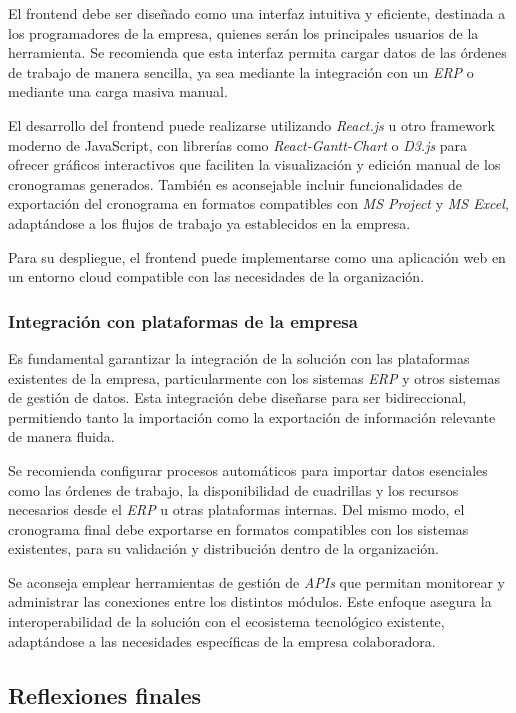 \documentclass{article}
\begin{document}
El frontend debe ser diseñado como una interfaz intuitiva y eficiente, destinada a los programadores de la empresa, quienes serán los principales usuarios de la herramienta. Se recomienda que esta interfaz permita cargar datos de las órdenes de trabajo de manera sencilla, ya sea mediante la integración con un \textit{ERP} o mediante una carga masiva manual.

El desarrollo del frontend puede realizarse utilizando \textit{React.js} u otro framework moderno de JavaScript, con librerías como \textit{React-Gantt-Chart} o \textit{D3.js} para ofrecer gráficos interactivos que faciliten la visualización y edición manual de los cronogramas generados. También es aconsejable incluir funcionalidades de exportación del cronograma en formatos compatibles con \textit{MS Project} y \textit{MS Excel}, adaptándose a los flujos de trabajo ya establecidos en la empresa.

Para su despliegue, el frontend puede implementarse como una aplicación web en un entorno cloud compatible con las necesidades de la organización.

\subsubsection{Integración con plataformas de la empresa}

Es fundamental garantizar la integración de la solución con las plataformas existentes de la empresa, particularmente con los sistemas \textit{ERP} y otros sistemas de gestión de datos. Esta integración debe diseñarse para ser bidireccional, permitiendo tanto la importación como la exportación de información relevante de manera fluida.

Se recomienda configurar procesos automáticos para importar datos esenciales como las órdenes de trabajo, la disponibilidad de cuadrillas y los recursos necesarios desde el \textit{ERP} u otras plataformas internas. Del mismo modo, el cronograma final debe exportarse en formatos compatibles con los sistemas existentes, para su validación y distribución dentro de la organización.

Se aconseja emplear herramientas de gestión de \textit{APIs} que permitan monitorear y administrar las conexiones entre los distintos módulos. Este enfoque asegura la interoperabilidad de la solución con el ecosistema tecnológico existente, adaptándose a las necesidades específicas de la empresa colaboradora.


\subsection{Reflexiones finales}  
\end{document}
